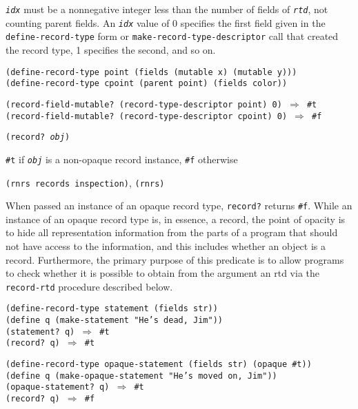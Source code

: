\texttt{\textit{idx}} must be a nonnegative integer less than the number of fields of
\texttt{\textit{rtd}}, not counting parent fields.
An \texttt{\textit{idx}} value of 0 specifies the first field given in the
\texttt{define-record-type} form or \texttt{make-record-type-descriptor}
call that created the record type, 1 specifies the second, and so on.

\begin{alltt}
(define-record-type point (fields (mutable x) (mutable y)))
(define-record-type cpoint (parent point) (fields color))

(record-field-mutable? (record-type-descriptor point) 0) \(\Rightarrow\) \#{}t
(record-field-mutable? (record-type-descriptor cpoint) 0) \(\Rightarrow\) \#{}f
\end{alltt}

\begin{description}

\label{records_s40}\item[procedure] \texttt{(record? \textit{obj})}



\item[returns] \texttt{\#{}t} if \texttt{\textit{obj}} is a non-opaque record instance, \texttt{\#{}f} otherwise


\item[libraries] \texttt{(rnrs records inspection)}, \texttt{(rnrs)}
\end{description}


When passed an instance of an opaque record type, \texttt{record?} returns
\texttt{\#{}f}.
While an instance of an opaque record type is, in essence, a record,
the point of opacity is to hide all representation information from the
parts of a program that should not have access to the information,
and this includes whether an object is a record.
Furthermore, the primary purpose of this predicate is to allow programs to
check whether it is possible to obtain from the argument an rtd via the
\texttt{record-rtd} procedure described below.


\begin{alltt}
(define-record-type statement (fields str))
(define q (make-statement "He's dead, Jim"))
(statement? q) \(\Rightarrow\) \#{}t
(record? q) \(\Rightarrow\) \#{}t

(define-record-type opaque-statement (fields str) (opaque \#{}t))
(define q (make-opaque-statement "He's moved on, Jim"))
(opaque-statement? q) \(\Rightarrow\) \#{}t
(record? q) \(\Rightarrow\) \#{}f
\end{alltt}


